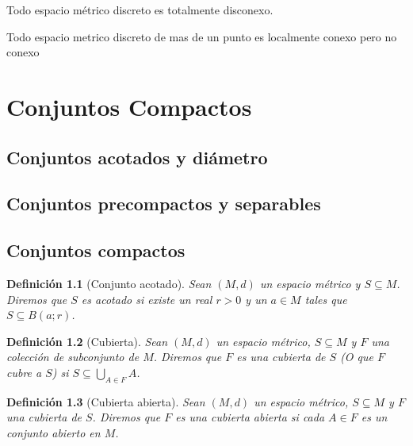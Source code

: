 \documentclass[oneside]{book} %
\theoremstyle{Teorema}
\newtheorem{Definicion}{Definición}[chapter]
\theoremstyle{Ejemplos}
\theoremstyle{[Obs]}
\renewcommand{\{}{\left\lbrace} %
\renewcommand{\}}{\right\rbrace} %
\newcommand{\U}{\bigcup} %
\renewcommand{\sc}{\subseteq} %
\begin{document}
			Todo espacio métrico discreto es totalmente disconexo.

			Todo espacio metrico discreto de mas de un punto es localmente conexo pero no conexo

	\chapter{Conjuntos Compactos}

		\section{Conjuntos acotados y diámetro}

		\section{Conjuntos precompactos y separables}

		\section{Conjuntos compactos}	

			\begin{Definicion}[Conjunto acotado]
				
				Sean $(M, d)$ un espacio métrico y $S \sc M$. Diremos que $S$ es acotado si existe un real $r > 0$ y un $a \in M$ tales que $S \sc B(a;r)$. \\

			\end{Definicion}

			\begin{Definicion}[Cubierta]
				
				Sean $(M, d)$ un espacio métrico, $S \sc M$ y $F$ una colección de subconjunto de $M$. Diremos que $F$ es una cubierta de $S$ (O que $F$ cubre a $S$) si $S \sc \displaystyle\U_{A \in F} A$. \\

			\end{Definicion}

			\begin{Definicion}[Cubierta abierta]
				
				Sean $(M, d)$ un espacio métrico, $S \sc M$ y $F$ una cubierta de $S$. Diremos que $F$ es una cubierta abierta si cada $A \in F$ es un conjunto abierto en $M$. \\

			\end{Definicion}
\end{document}
